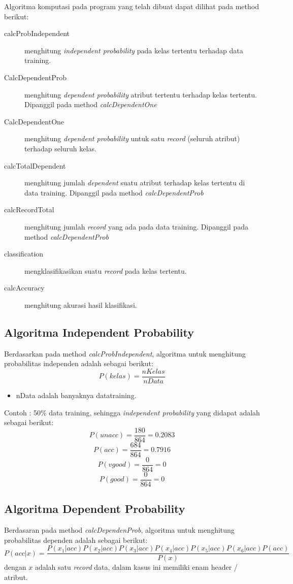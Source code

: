 \documentclass[11pt,a4paper]{report}
\begin{document}
	Algoritma komputasi pada program yang telah dibuat dapat dilihat pada method berikut:
	\begin{description}
		\item[calcProbIndependent] menghitung \emph{independent probability} pada kelas tertentu terhadap data training.
		\item[CalcDependentProb] menghitung \emph{dependent probability} atribut tertentu terhadap kelas tertentu. Dipanggil pada method \emph{calcDependentOne}
		\item[CalcDependentOne] menghitung \emph{dependent probability} untuk satu \emph{record} (seluruh atribut) terhadap seluruh kelas.
		\item[calcTotalDependent] menghitung jumlah \emph{dependent} suatu atribut terhadap kelas tertentu di data training. Dipanggil pada method \emph{calcDependentProb}
		\item[calcRecordTotal] menghitung jumlah \emph{record} yang ada pada data training. Dipanggil pada method \emph{calcDependentProb}
		\item[classification] mengklasifikasikan suatu \emph{record} pada kelas tertentu.
		\item[calcAccuracy] menghitung akurasi hasil klasifikasi. 
	\end{description}
	\subsection{Algoritma Independent Probability}
	Berdasarkan pada method \emph{calcProbIndependent}, algoritma untuk menghitung probabilitas independen adalah sebagai berikut:
	\[ P(kelas) = \frac{nKelas}{nData}\]
	\begin{itemize}
		\item nData adalah banyaknya datatraining.
	\end{itemize}
	Contoh : 50\% data training, sehingga \emph{independent probability} yang didapat adalah sebagai berikut:
	\[ P(unacc) = \frac{180}{864}=0.2083\]
	\[ P(acc) = \frac{684}{864}=0.7916\]
	\[ P(vgood) = \frac{0}{864}=0\]
	\[ P(good) = \frac{0}{864}=0\]
	
	\subsection{Algoritma Dependent Probability}
	Berdasaran pada method \emph{calcDependenProb}, algoritma untuk menghitung probabilitas dependen adalah sebagai berikut:
	\[ P(acc|x)=\frac{P(x_{1}|acc)P(x_{2}|acc)P(x_{3}|acc)P(x_{4}|acc)P(x_{5}|acc)P(x_{6}|acc)P(acc)}{P(x)} \]
	dengan $x$ adalah satu \emph{record} data, dalam kasus ini memiliki enam header / atribut. 
	\newpage
	
\end{document}
